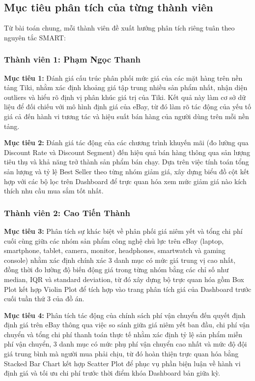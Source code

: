 \subsection{Mục tiêu phân tích của từng thành viên}

Từ bài toán chung, mỗi thành viên đề xuất hướng phân tích riêng tuân theo nguyên tắc SMART:

\subsubsection{Thành viên 1: Phạm Ngọc Thanh}

\textbf{Mục tiêu 1:} Đánh giá cấu trúc phân phối mức giá của các mặt hàng trên nền tảng Tiki, nhằm xác định khoảng giá tập trung nhiều sản phẩm nhất, nhận diện outliers và hiểu rõ định vị phân khúc giá trị của Tiki. Kết quả này làm cơ sở dữ liệu để đối chiếu với mô hình định giá của eBay, từ đó làm rõ tác động của yếu tố giá cả đến hành vi tương tác và hiệu suất bán hàng của người dùng trên mỗi nền tảng.

\textbf{Mục tiêu 2:} Đánh giá tác động của các chương trình khuyến mãi (đo lường qua Discount Rate và Discount Segment) đến hiệu quả bán hàng thông qua sản lượng tiêu thụ và khả năng trở thành sản phẩm bán chạy. Dựa trên việc tính toán tổng sản lượng và tỷ lệ Best Seller theo từng nhóm giảm giá, xây dựng biểu đồ cột kết hợp với các bộ lọc trên Dashboard để trực quan hóa xem mức giảm giá nào kích thích nhu cầu mua sắm tốt nhất.

\subsubsection{Thành viên 2: Cao Tiến Thành}

\textbf{Mục tiêu 3:} Phân tích sự khác biệt về phân phối giá niêm yết và tổng chi phí cuối cùng giữa các nhóm sản phẩm công nghệ chủ lực trên eBay (laptop, smartphone, tablet, camera, monitor, headphones, smartwatch và gaming console) nhằm xác định chính xác 3 danh mục có mức giá trung vị cao nhất, đồng thời đo lường độ biến động giá trong từng nhóm bằng các chỉ số như median, IQR và standard deviation, từ đó xây dựng bộ trực quan hóa gồm Box Plot kết hợp Violin Plot để tích hợp vào trang phân tích giá của Dashboard trước cuối tuần thứ 3 của đồ án.


\textbf{Mục tiêu 4:} Phân tích tác động của chính sách phí vận chuyển đến quyết định định giá trên eBay thông qua việc so sánh giữa giá niêm yết ban đầu, chi phí vận chuyển và tổng chi phí thanh toán thực tế nhằm xác định tỷ lệ sản phẩm miễn phí vận chuyển, 3 danh mục có mức phụ phí vận chuyển cao nhất và mức độ đội giá trung bình mà người mua phải chịu, từ đó hoàn thiện trực quan hóa bằng Stacked Bar Chart kết hợp Scatter Plot để phục vụ phần biện luận về hành vi định giá và tối ưu chi phí trước thời điểm khóa Dashboard bản giữa kỳ.

